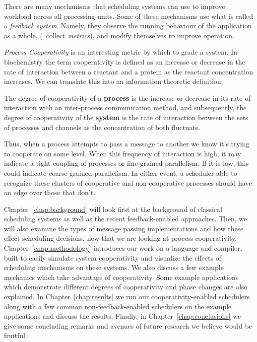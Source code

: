 There are many mechanisms that scheduling systems can use to improve workload 
across all processing units. Some of these 
mechanisms use what is called a {\em feedback system}. Namely, they observe the 
running behaviour of the application as a whole, (\ie~collect {\em metrics}),
and modify themselves to improve operation. 

{\em Process Cooperativity} is an interesting metric by which to grade a system. In
biochemistry the term cooperativity is defined as an increase or decrease
in the rate of interaction between a reactant and a protein as the reactant
concentration increases. We can translate this into an information theoretic 
definition: 
\begin{newdef}\label{def:degree of cooperativity}
    The degree of cooperativity of a \textbf{process} is the increase or decrease 
    in its rate of interaction with an inter-process communication method, and
    subsequently, the degree of cooperativity of the \textbf{system} is the rate of
    interaction between the sets of processes and channels as the concentration
    of both fluctuate.
\end{newdef}

Thus, when a process attempts to pass a message to another we know it's trying 
to cooperate on some level. When this frequency of interaction is high, it may
indicate a tight coupling of processes or fine-grained parallelism. If it is 
low, this could indicate coarse-grained parallelism. In either event, a 
scheduler able to recognize these clusters of cooperative and non-cooperative 
processes should have an edge over those that don't.

Chapter~\ref{chap:background} will look first at the background of classical 
scheduling systems as well as the recent feedback-enabled approaches. Then, we 
will also examine the types of message passing implementations and how these
effect scheduling decisions, now that we are looking at process cooperativity.
Chapter~\ref{chap:methodology} introduces our work on a language and compiler,
built to easily simulate system cooperativity and visualize the effects of 
scheduling mechanisms on these systems. We also discuss a few example mechanics
which take advantage of cooperativity. Some example applications which 
demonstrate different degrees of cooperativity and phase changes are also 
explained.
In Chapter~\ref{chap:results} we run our cooperativity-enabled schedulers along
with a few common non-feedback-enabled schedulers on the example applications
and discuss the results. 
Finally, in Chapter~\ref{chap:conclusions} we give some concluding remarks and
avenues of future research we believe would be fruitful.

